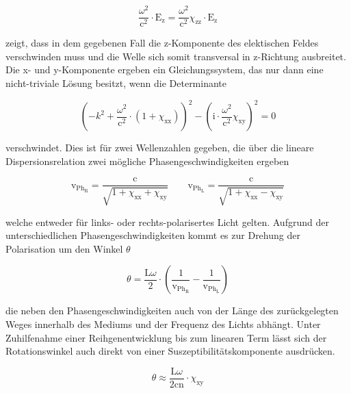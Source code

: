         \begin{equation*}
            \frac{\omega^2}{\text{c}^2} \cdot \text{E}_{\text{z}} = \frac{\omega^2}{\text{c}^2} \chi_{\text{zz}} \cdot \text{E}_{\text{z}}    
        \end{equation*}

        zeigt, dass in dem gegebenen Fall die z-Komponente des elektischen Feldes verschwinden muss und die Welle sich somit transversal in z-Richtung ausbreitet. Die x- und y-Komponente ergeben ein 
        Gleichungssystem, das nur dann eine nicht-triviale Lösung besitzt, wenn die Determinante

        \begin{equation*}
            \left(-k^2 + \frac{\omega^2}{\text{c}^2} \cdot \left(1 + \chi_{\text{xx}}\right)\right)^2 - \left(\text{i} \cdot \frac{\omega^2}{\text{c}^2} \chi_{\text{xy}} \right)^2 = 0
        \end{equation*}

        verschwindet. Dies ist für zwei Wellenzahlen gegeben, die über die lineare Dispersionsrelation zwei mögliche Phasengeschwindigkeiten ergeben

        \begin{equation*}
            \text{v}_{\text{Ph}_{\text{R}}} = \frac{\text{c}}{\sqrt{1 + \chi_{\text{xx}} + \chi_{\text{xy}}}} \qquad \text{v}_{\text{Ph}_{\text{L}}} = \frac{\text{c}}{\sqrt{1 + \chi_{\text{xx}} - \chi_{\text{xy}}}}
            \label{eqn:Phasengeschwindigkeiten}
        \end{equation*}

        welche entweder für links- oder rechts-polarisertes Licht gelten. Aufgrund der unterschiedlichen Phasengeschwindigkeiten kommt es zur Drehung der Polarisation um den Winkel $\theta$

        \begin{equation*}
            \theta = \frac{\text{L}\omega}{2} \cdot \left(\frac{1}{ \text{v}_{\text{Ph}_{\text{R}}}} - \frac{1}{ \text{v}_{\text{Ph}_{\text{L}}}}\right)
        \end{equation*}

        die neben den Phasengeschwindigkeiten auch von der Länge des zurückgelegten Weges innerhalb des Mediums und der Frequenz des Lichts abhängt. Unter Zuhilfenahme einer Reihgenentwicklung bis zum linearen
        Term lässt sich der Rotationswinkel auch direkt von einer Suszeptibilitätskomponente ausdrücken.

        \begin{equation}
            \theta \approx \frac{\text{L}\omega}{2\text{cn}} \cdot \chi_{\text{xy}}
            \label{eqn:drehwinkel_näherung}
        \end{equation}


